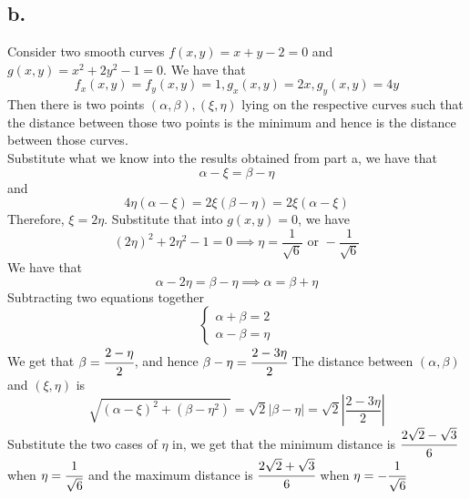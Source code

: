 \documentclass[11pt]{article}
\begin{document}
\subsection*{b.}
Consider two smooth curves $f(x,y) = x + y - 2 = 0$ and $g(x,y) = x^2+2y^2-1=0$.
We have that
\[
    f_x(x,y) = f_y(x,y) = 1, g_x(x,y) = 2x, g_y(x,y) = 4y    
\]
Then there is two points $(\alpha,\beta), (\xi,\eta)$ lying on the respective curves such that 
the distance between those two points is the minimum and hence is the distance between those curves. \\
Substitute what we know into the results obtained from part a, we have that
\[
    \alpha-\xi = \beta - \eta     
\] 
and 
\[
    4\eta (\alpha-\xi) = 2\xi (\beta-\eta) = 2\xi(\alpha-\xi)    
\]
Therefore, $\xi = 2\eta$. Substitute that into $g(x,y) = 0$, we have
\[
    (2\eta)^2 + 2\eta^2 - 1 = 0 \implies \eta = \frac{1}{\sqrt{6}} \text{ or } -\frac{1}{\sqrt{6}}
\]
We have that 
\[  
    \alpha - 2\eta = \beta - \eta \implies \alpha = \beta + \eta
\]
Subtracting two equations together
\[
    \begin{cases}
        \alpha + \beta = 2 \\
        \alpha - \beta = \eta 
    \end{cases}    
\]
We get that $\beta = \cfrac{2-\eta}{2}$, and hence $\beta - \eta = \cfrac{2-3\eta}{2}$ 
The distance between $(\alpha,\beta)$ and $(\xi,\eta)$ is 
\[
    \sqrt{(\alpha- \xi)^2 + (\beta - \eta^2)} = \sqrt{2}|\beta-\eta| = \sqrt{2}\left|\frac{2-3\eta}{2}\right|
\]
Substitute the two cases of $\eta$ in, we get that 
the minimum distance is $\cfrac{2\sqrt{2} - \sqrt{3}}{6}$ when $\eta = \cfrac{1}{\sqrt{6}}$ 
and the maximum distance is $\cfrac{2\sqrt{2} + \sqrt{3}}{6}$ when $\eta = -\cfrac{1}{\sqrt{6}}$

\pagebreak
\end{document}
